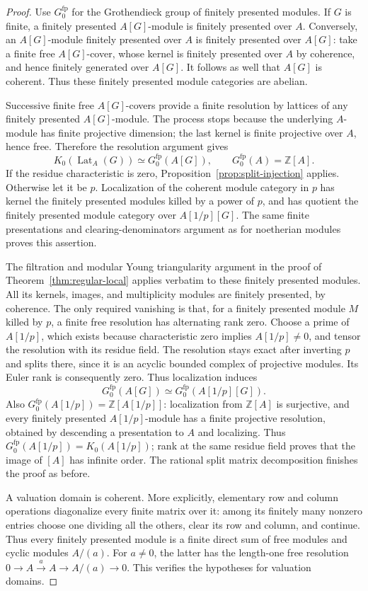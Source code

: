 \begin{proof}
Use $G_0^{\mathrm{fp}}$ for the Grothendieck group of finitely
presented modules.  If $G$ is finite, a finitely presented
$A[G]$-module is finitely presented over $A$.  Conversely, an
$A[G]$-module finitely presented over $A$ is finitely presented
over $A[G]$: take a finite free $A[G]$-cover, whose kernel is
finitely presented over $A$ by coherence, and hence finitely
generated over $A[G]$.  It follows as well that $A[G]$ is
coherent.  Thus these finitely presented module categories
are abelian.

Successive finite free $A[G]$-covers provide a finite resolution
by lattices of any finitely presented $A[G]$-module.  The
process stops because the underlying $A$-module has finite
projective dimension; the last kernel is finite projective
over $A$, hence free.  Therefore the resolution argument gives
\[
 K_0(\operatorname{Lat}_A(G))\simeq
 G_0^{\mathrm{fp}}(A[G]),\qquad
 G_0^{\mathrm{fp}}(A)=\mathbb Z[A].
\]
If the residue characteristic is zero, Proposition~\ref{prop:split-injection} applies.  Otherwise let it be
$p$.  Localization of the coherent module category in $p$
has kernel the finitely presented modules killed by a power
of $p$, and has quotient the finitely presented module
category over $A[1/p][G]$.  The same finite presentations and
clearing-denominators argument as for noetherian modules
proves this assertion.

The filtration and modular Young triangularity argument in
the proof of Theorem~\ref{thm:regular-local} applies verbatim
to these finitely presented modules.  All its kernels,
images, and multiplicity modules are finitely presented,
by coherence.  The only required vanishing is that, for a
finitely presented module $M$ killed by $p$, a finite free
resolution has alternating rank zero.  Choose a prime of
$A[1/p]$, which exists because characteristic zero implies
$A[1/p]\ne0$, and tensor the resolution with its residue
field.  The resolution stays exact after inverting $p$ and
splits there, since it is an acyclic bounded complex of
projective modules.  Its Euler rank is consequently zero.
Thus localization induces
\[
 G_0^{\mathrm{fp}}(A[G])\simeq
 G_0^{\mathrm{fp}}(A[1/p][G]).
\]
Also $G_0^{\mathrm{fp}}(A[1/p])=\mathbb Z[A[1/p]]$:
localization from $\mathbb Z[A]$ is surjective, and every finitely presented $A[1/p]$-module has a finite
projective resolution, obtained by descending a presentation to $A$
and localizing.  Thus $G_0^{\mathrm{fp}}(A[1/p])=K_0(A[1/p])$;
rank at the same residue field proves that the image of $[A]$
has infinite order.  The rational split matrix decomposition
finishes the proof as before.

A valuation domain is coherent.  More explicitly, elementary
row and column operations diagonalize every finite matrix
over it: among its finitely many nonzero entries choose one
dividing all the others, clear its row and column, and
continue.  Thus every finitely presented module is a finite
direct sum of free modules and cyclic modules $A/(a)$.
For $a\ne0$, the latter has the length-one free resolution
$0\to A\xrightarrow{a}A\to A/(a)\to0$.
This verifies the hypotheses for valuation domains.
\end{proof}
